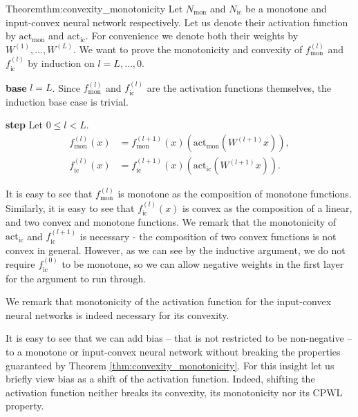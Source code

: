 \begin{proofref}{Theorem}{thm:convexity_monotonicity}
    Let $N_{\text{mon}}$ and $N_{\text{ic}}$ be a monotone and input-convex neural network respectively. Let us denote their activation function by $\text{act}_{\text{mon}}$ and $\text{act}_{\text{ic}}$.
    For convenience we denote both their weights by $W^{(1)},\dots,W^{(L)}$.
    We want to prove the monotonicity and convexity of $f_{\text{mon}}^{(l)}$ and $f_{\text{ic}}^{(l)}$ by induction on $l=L,\dots,0$.

    \textbf{base} $l=L$.
        Since $f_{\text{mon}}^{(l)}$ and $f_{\text{ic}}^{(l)}$ are the activation functions themselves, the induction base case is trivial.

    \textbf{step} Let $0 \leq l < L$.
        \begin{align}
            f_{\text{mon}}^{(l)}(x) &= f_{\text{mon}}^{(l+1)}(x) \left( \text{act}_{\text{mon}}\left( W^{(l+1)} x \right) \right), \\
            f_{\text{ic}}^{(l)}(x) &= f_{\text{ic}}^{(l+1)}(x) \left( \text{act}_{\text{ic}}\left( W^{(l+1)} x \right) \right).
        \end{align}

        It is easy to see that $f_{\text{mon}}^{(l)}$ is monotone as the composition of monotone functions.
        Similarly, it is easy to see that $f_{\text{ic}}^{(l)}(x)$ is convex as the composition of a linear, and two convex and monotone functions.
        We remark that the monotonicity of $\text{act}_{\text{ic}}$ and $f_{\text{ic}}^{(l+1)}$ is necessary - the composition of two convex functions is not convex in general.
        However, as we can see by the inductive argument, we do not require $f_{\text{ic}}^{(0)}$ to be monotone, so we can allow negative weights in the first layer for the argument to run through.
\end{proofref}

We remark that monotonicity of the activation function for the input-convex neural networks is indeed necessary for its convexity.

\begin{remark}[Bias] \label{rem:bias}
    It is easy to see that we can add bias -- that is not restricted to be non-negative -- to a monotone or input-convex neural network without breaking the properties guaranteed by Theorem \ref{thm:convexity_monotonicity}.
    For this insight let us briefly view bias as a shift of the activation function. Indeed, shifting the activation function neither breaks its convexity, its monotonicity nor its CPWL property.
\end{remark}

